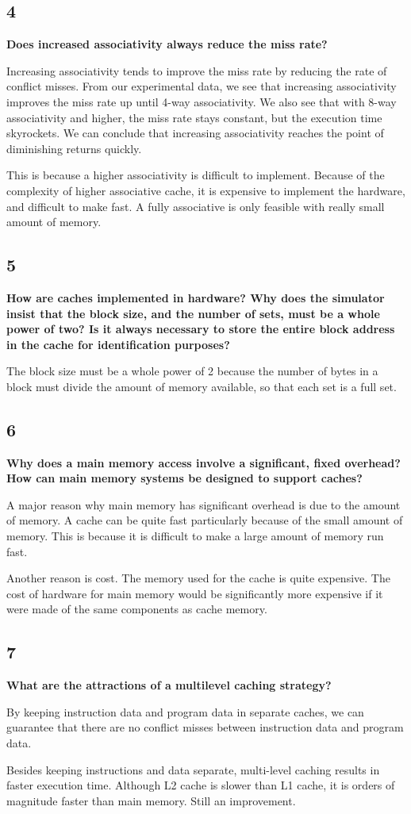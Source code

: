 \documentclass[letterpaper, 12pt, oneside]{memoir}
\begin{document}
\subsection{4}
\textbf{Does increased associativity always reduce the miss rate?}

Increasing associativity tends to improve the miss rate by reducing the rate of
conflict misses. From our experimental data, we see that increasing
associativity improves the miss rate up until 4-way associativity. We also see
that with 8-way associativity and higher, the miss rate stays constant, but the
execution time skyrockets. We can conclude that increasing associativity reaches
the point of diminishing returns quickly.

This is because a higher associativity is difficult to implement. Because of
the complexity of higher associative cache, it is expensive to implement the
hardware, and difficult to make fast. A fully associative is only feasible with
really small amount of memory.


\subsection{5}
\textbf{How are caches implemented in hardware? Why does the simulator insist
that the block size, and the number of sets, must be a whole power of two? Is it always
necessary to store the entire block address in the cache for identification
purposes?}

The block size must be a whole power of 2 because the number of bytes in a block
must divide the amount of memory available, so that each set is a full set. 


\subsection{6}
\textbf{Why does a main memory access involve a significant, fixed overhead? How
can main memory systems be designed to support caches?}

A major reason why main memory has significant overhead is due to the amount of 
memory. A cache can be quite fast particularly because of the small amount of
memory. This is because it is difficult to make a large amount of memory run
fast.

Another reason is cost. The memory used for the cache is quite expensive. The
cost of hardware for main memory would be significantly more expensive if it
were made of the same components as cache memory.



\subsection{7}
\textbf{What are the attractions of a multilevel caching strategy?}

By keeping instruction data and program data in separate caches, we can
guarantee that there are no conflict misses between instruction data and
program data.

Besides keeping instructions and data separate, multi-level caching results in
faster execution time. Although L2 cache is slower than L1 cache, it is orders
of magnitude faster than main memory. Still an improvement.
\end{document}
